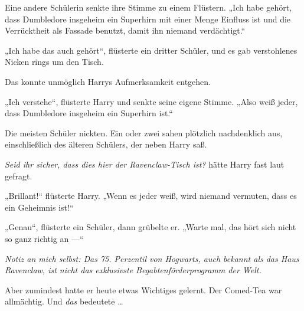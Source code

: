 Eine andere Schülerin senkte ihre Stimme zu einem Flüstern.
„Ich habe gehört, dass Dumbledore insgeheim ein Superhirn mit einer Menge Einfluss ist und die Verrücktheit als Fassade benutzt, damit ihn niemand verdächtigt.“

„Ich habe das auch gehört“, flüsterte ein dritter Schüler, und es gab verstohlenes Nicken rings um den Tisch.

Das konnte unmöglich Harrys Aufmerksamkeit entgehen.

„Ich verstehe“, flüsterte Harry und senkte seine eigene Stimme.
„Also weiß jeder, dass Dumbledore insgeheim ein Superhirn ist.“

Die meisten Schüler nickten. Ein oder zwei sahen plötzlich nachdenklich aus, einschließlich des älteren Schülers, der neben Harry saß.

\emph{Seid ihr sicher, dass dies hier der Ravenclaw-Tisch ist?} hätte Harry fast laut gefragt.

„Brillant!“ flüsterte Harry.
„Wenn es jeder weiß, wird niemand vermuten, dass es ein Geheimnis ist!“

„Genau“, flüsterte ein Schüler, dann grübelte er.
„Warte mal, das hört sich nicht so ganz richtig an —“

\emph{Notiz an mich selbst: Das 75. Perzentil von Hogwarts, auch bekannt als das Haus Ravenclaw, ist nicht das exklusivste Begabtenförderprogramm der Welt.}

Aber zumindest hatte er heute etwas Wichtiges gelernt. Der Comed-Tea war allmächtig. Und \emph{das} bedeutete …

